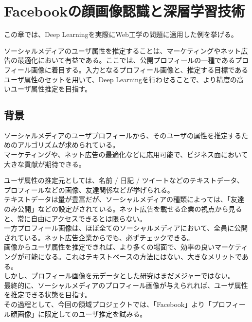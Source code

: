 \chapter{Facebookの顔画像認識と深層学習技術}
この章では、Deep Learningを実際にWeb工学の問題に適用した例を挙げる。\par
ソーシャルメディアのユーザ属性を推定することは、マーケティングやネット広告の最適化において有益である。ここでは、公開プロフィールの一種であるプロフィール画像に着目する。入力となるプロフィール画像と、推定する目標であるユーザ属性のセットを用いて、Deep Learningを行わせることで、より精度の高いユーザ属性推定を目指す。

\section{背景}
ソーシャルメディアのユーザプロフィールから、そのユーザの属性を推定するためのアルゴリズムが求められている。\\
マーケティングや、ネット広告の最適化などに応用可能で、ビジネス面において大きな貢献が期待できる。\par
ユーザ属性の推定元としては、名前 / 日記 / ツイートなどのテキストデータ、プロフィールなどの画像、友達関係などが挙げられる。 \cite{pennacchiotti2011a-machine}\\

テキストデータは量が豊富だが、ソーシャルメディアの種類によっては、「友達のみ公開」などの設定がされている。ネット広告を載せる企業の視点から見ると、常に自由にアクセスできるとは限らない。\\

一方プロフィール画像は、ほぼ全てのソーシャルメディアにおいて、全員に公開されている。ネット広告企業からでも、必ずチェックできる。\\

画像からユーザ属性を推定できれば、より多くの場面で、効率の良いマーケティングが可能になる。これはテキストベースの方法にはない、大きなメリットである。\\

しかし、プロフィール画像を元データとした研究はまだメジャーではない。\\
最終的に、ソーシャルメディアのプロフィール画像が与えられれば、ユーザ属性を推定できる状態を目指す。\\
その過程として、今回の領域プロジェクトでは、「Facebook」より「プロフィール顔画像」に限定してのユーザ推定を試みる。\par

